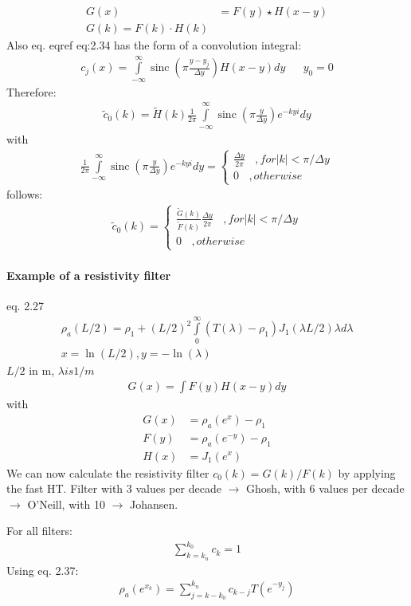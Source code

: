 \begin{align*}
G(x)&=F(y)\star H(x-y)\\
G(k)=F(k)\cdot H(k)
\end{align*}
Also eq. eqref eq:2.34 has the form of a convolution integral:
\begin{align*}
c_j(x)=\int\limits_{-\infty}^{\infty}\operatorname{sinc}\left(\pi\frac{y-y_j}{\Delta y}\right)H(x-y)dy && y_0=0
\end{align*}
Therefore:
\begin{align*}
\tilde{c}_0(k)=\tilde{H}(k)\frac{1}{2\pi}\int\limits_{-\infty}^{\infty}\operatorname{sinc}\left(\pi\frac{y}{\Delta y}\right)e^{-kyi}dy
\end{align*}
with 
\begin{align*}
\frac{1}{2\pi}\int\limits_{-\infty}^{\infty}\operatorname{sinc}\left(\pi\frac{y}{\Delta y}\right)e^{-kyi}dy=\begin{cases}
\frac{\Delta y}{2\pi}~~~~, for |k|<\pi/\Delta y\\
0 ~~~~, otherwise
\end{cases}
\end{align*}
follows:
\begin{align*}
\tilde{c}_0(k)=\begin{cases}
\frac{\tilde{G}(k)}{\tilde{F}(k)}\frac{\Delta y}{2\pi}~~~~, for |k|<\pi/\Delta y\\
0~~~~, otherwise
\end{cases}
\end{align*}


\paragraph{Example of a resistivity filter}
eq. 2.27
\begin{align*}
\rho_a(L/2)=\rho_1+(L/2)^2\int\limits_{0}^{\infty}(T(\lambda)-\rho_1)J_1(\lambda L/2)\lambda d\lambda\\
x=\ln(L/2), y=-\ln(\lambda)
\end{align*}
$L/2$ in m, $\lambda is 1/m$
\begin{align*}
G(x)=\int F(y) H(x-y)dy
\end{align*}
with
\begin{align*}
G(x)&=\rho_a(e^x)-\rho_1\\
F(y)&=\rho_a(e^{-y})-\rho_1\\
H(x)&=J_1(e^x)
\end{align*}
We can now calculate the resistivity filter $c_0(k)=G(k)/F(k)$ by applying the fast HT.
Filter with 3 values per decade $\rightarrow$ Ghosh, with 6 values per decade $\rightarrow$ O'Neill, with 10 $\rightarrow$ Johansen.

For all filters:
\begin{align*}
\sum_{k=k_n}^{k_0}c_k=1
\end{align*}
Using eq. 2.37:
\begin{align*}
\rho_a(e^{x_k})=\sum_{j=k-k_0}^{k_n}c_{k-j}T(e^{-y_j})
\end{align*}